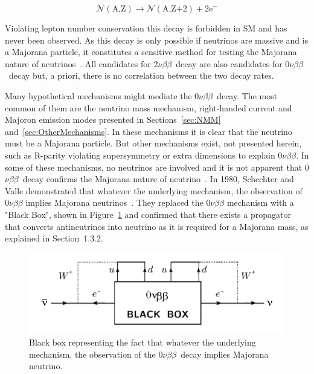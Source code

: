 \documentclass[main.tex]{subfiles}
\begin{document}
\begin{equation}
\mathcal{N} (\text{A,Z}) \rightarrow \mathcal{N} (\text{A,Z+2}) + \text{2e}^- 
\end{equation}


\bigskip


\NI Violating lepton number conservation this decay is forbidden in SM and has never been observed. As this decay is only possible if neutrinos are massive and is a Majorana particle, it constitutes a sensitive method for testing the Majorana nature of neutrinos~\cite{RacahNeutrinolessDBDMajorana}. All candidates for 2$\nu\beta\beta$~decay are also candidates for 0$\nu\beta\beta$~decay but, a priori, there is no correlation between the two decay rates. 


\bigskip



\NI Many hypothetical mechanisms might mediate the 0$\nu\beta\beta$~decay. The most common of them are the neutrino mass mechanism, right-handed current and Majoron emission modes presented in Sections~\ref{sec:NMM} and~\ref{sec:OtherMechanisms}. In these mechanisms it is clear that the neutrino must be a Majorana particle. But other mechanisms exist, not presented herein, such as R-parity violating supersymmetry or extra dimensions to explain 0$\nu\beta\beta$. In some of these mechanisms, no neutrinos are involved and it is not apparent that 0$\nu\beta\beta$~decay confirms the Majorana nature of neutrino~\cite{SUSYandDBD}. In 1980, Schechter and Valle demonstrated that whatever the underlying mechanism, the observation of 0$\nu\beta\beta$ implies Majorana neutrinos~\cite{SchechterValle}. They replaced the 0$\nu\beta\beta$ mechanism with a "Black Box", shown in Figure~\ref{0nubbBlackBox} and confirmed that there exists a propagator that converts antineutrinos into neutrino as it is required for a Majorana mass, as explained in Section~1.3.2. 

\smallskip

\begin{figure}[h!]
\begin{center}
\includegraphics[scale=0.9]{pictures/Chap2/0nubbBlackBox.pdf}
\caption{Black box representing the fact that whatever the underlying mechanism, the observation of the 0$\nu\beta\beta$~decay implies Majorana neutrino.}
\label{0nubbBlackBox}
\end{center}
\end{figure}
\end{document}

